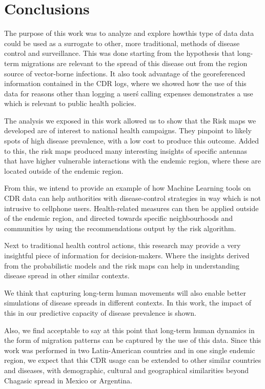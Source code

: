 \chapter{Conclusions}\label{ch:conclusions}


The purpose of this work was to analyze and explore howthis type of data data could be used as a surrogate to other, more traditional, methods of disease control and surveillance.
This was done starting from the hypothesis that long-term migrations 
are relevant to the spread of this disease out from the region source of vector-borne infections.
It also took advantage of the georeferenced information contained in the CDR logs, where we showed how the use of this data for reasons other than logging a user\'s calling expenses demonstrates a use which is relevant to public health policies. 


The analysis we exposed in this work allowed us to show that the Risk maps we developed are of interest to national health campaigns.
They pinpoint to likely spots of high disease prevalence, with a low cost to produce this outcome.
Added to this, the risk maps produced many interesting insights of specific antennas that have higher vulnerable interactions with the endemic region, where these are located outside of the endemic region.



From this, we intend to provide an example of how Machine Learning tools on CDR data can help authorities with disease-control strategies in way which is not intrusive to cellphone users.
Health-related measures can then be applied outside of the endemic region, and directed towards specific neighbourhoods and communities by using the recommendations output by the risk algorithm.

Next to traditional health control actions, this research may provide a very insightful piece of information for decision-makers.
Where the insights derived from the probabilistic models and the risk maps can help in understanding disease spread in other similar contexts.


We think that capturing long-term human movements will also enable better simulations of disease spreads in different contexts.
In this work, the impact of this in our predictive capacity of disease prevalence is shown.


Also, we find acceptable to say at this point that long-term human dynamics in the form of migration patterns can be captured by the use of this data.
Since this work was performed in two Latin-American countries and in one single endemic region, we expect that this CDR usage can be extended to other similar countries and diseases, with demographic, cultural and geographical similarities beyond Chagasic spread in Mexico or Argentina.



